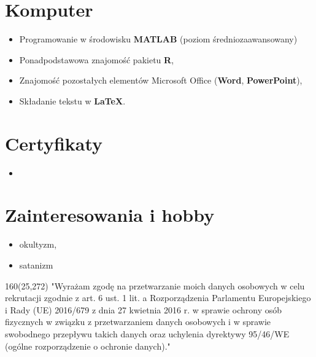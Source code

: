 \documentclass[10pt,a4paper,sans]{moderncv}   %
\begin{document}

\section{Komputer}
{\begin{itemize}
	\item Programowanie w środowisku \textbf{MATLAB} (poziom średniozaawansowany)
    \item Ponadpodstawowa znajomość pakietu \textbf{R},
	\item Znajomość pozostałych elementów Microsoft Office (\textbf{Word}, \textbf{PowerPoint}),
	\item Składanie tekstu w \textbf{\LaTeX}.
\end{itemize}}

\section{Certyfikaty}
{\begin{itemize}
 \item
\end{itemize}}


\section{Zainteresowania i hobby}
{\begin{itemize}
\item okultyzm,
\item satanizm

\end{itemize}}

\begin{textblock}{160}(25,272)
\noindent "Wyrażam zgodę na przetwarzanie moich danych osobowych w celu rekrutacji zgodnie z art. 6 ust. 1 lit. a Rozporządzenia Parlamentu Europejskiego i Rady (UE) 2016/679 z dnia 27 kwietnia 2016 r. w sprawie ochrony osób fizycznych w związku z przetwarzaniem danych osobowych i w sprawie swobodnego przepływu takich danych oraz uchylenia dyrektywy 95/46/WE (ogólne rozporządzenie o ochronie danych)."

\end{textblock}
\end{document}
